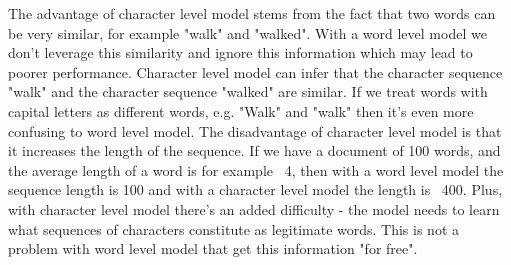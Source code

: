 The advantage of character level model stems from the fact that two words can be very similar, for example "walk" and "walked". 
With a word level model we don't leverage this similarity and ignore this information which may lead to poorer performance. 
Character level model can infer that the character sequence "walk" and the character sequence "walked" are similar. If we treat words with capital 
letters as different words, e.g. "Walk" and "walk" then it's even more confusing to word level model.
The disadvantage of character level model is that it increases the length of the sequence. If we have a document of 100 words, 
and the average length of a word is for example ~4, then with a word level model the sequence length is 100 and with a character 
level model the length is ~400. Plus, with character level model there's an added difficulty - the model needs to learn what sequences of characters 
constitute as legitimate words. This is not a problem with word level model that get this information "for free".